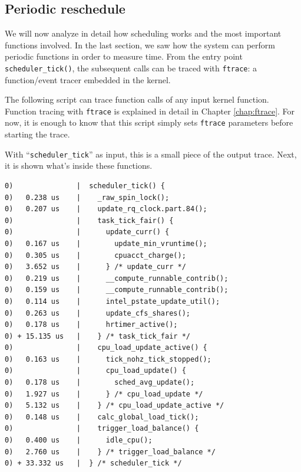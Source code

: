 \subsection{Periodic reschedule}
\label{sec:periodic_reschedule}
We will now analyze in detail how scheduling works and the most important functions involved. In the last section, we saw how the system can perform periodic functions in order to measure time. From the entry point \verb|scheduler_tick()|, the subsequent calls can be traced with \verb|ftrace|: a function/event tracer embedded in the kernel.

The following script can trace function calls of any input kernel function. Function tracing with \verb|ftrace| is explained in detail in Chapter \ref{chap:ftrace}. For now, it is enough to know that this script simply sets \verb|ftrace| parameters before starting the trace. 
With ``\verb|scheduler_tick|'' as input, this is a small piece of the output trace. Next, it is shown what's inside these functions.
\begin{Verbatim}
0)               |  scheduler_tick() {
0)   0.238 us    |    _raw_spin_lock();
0)   0.207 us    |    update_rq_clock.part.84();
0)               |    task_tick_fair() {
0)               |      update_curr() {
0)   0.167 us    |        update_min_vruntime();
0)   0.305 us    |        cpuacct_charge();
0)   3.652 us    |      } /* update_curr */
0)   0.219 us    |      __compute_runnable_contrib();
0)   0.159 us    |      __compute_runnable_contrib();
0)   0.114 us    |      intel_pstate_update_util();
0)   0.263 us    |      update_cfs_shares();
0)   0.178 us    |      hrtimer_active();
0) + 15.135 us   |    } /* task_tick_fair */
0)               |    cpu_load_update_active() {
0)   0.163 us    |      tick_nohz_tick_stopped();
0)               |      cpu_load_update() {
0)   0.178 us    |        sched_avg_update();
0)   1.927 us    |      } /* cpu_load_update */
0)   5.132 us    |    } /* cpu_load_update_active */
0)   0.148 us    |    calc_global_load_tick();
0)               |    trigger_load_balance() {
0)   0.400 us    |      idle_cpu();
0)   2.760 us    |    } /* trigger_load_balance */
0) + 33.332 us   |  } /* scheduler_tick */
\end{Verbatim}

